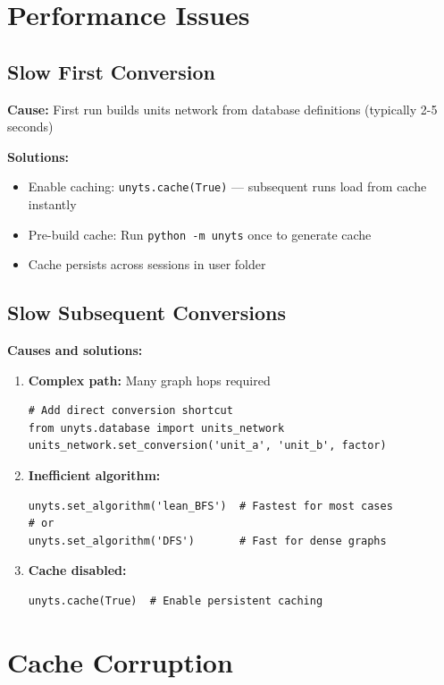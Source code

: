 \documentclass[11pt,a4paper]{report}
\begin{document}
\section{Performance Issues}

\subsection{Slow First Conversion}

\textbf{Cause:} First run builds units network from database definitions (typically 2-5 seconds)

\textbf{Solutions:}
\begin{itemize}
\item Enable caching: \texttt{unyts.cache(True)} — subsequent runs load from cache instantly
\item Pre-build cache: Run \texttt{python -m unyts} once to generate cache
\item Cache persists across sessions in user folder
\end{itemize}

\subsection{Slow Subsequent Conversions}

\textbf{Causes and solutions:}
\begin{enumerate}
\item \textbf{Complex path:} Many graph hops required
\begin{lstlisting}[style=pythonstyle]
# Add direct conversion shortcut
from unyts.database import units_network
units_network.set_conversion('unit_a', 'unit_b', factor)
\end{lstlisting}

\item \textbf{Inefficient algorithm:}
\begin{lstlisting}[style=pythonstyle]
unyts.set_algorithm('lean_BFS')  # Fastest for most cases
# or
unyts.set_algorithm('DFS')       # Fast for dense graphs
\end{lstlisting}

\item \textbf{Cache disabled:}
\begin{lstlisting}[style=pythonstyle]
unyts.cache(True)  # Enable persistent caching
\end{lstlisting}
\end{enumerate}

\section{Cache Corruption}
\end{document}
